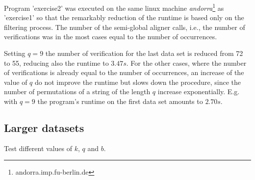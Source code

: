 \documentclass[11pt, notitlepage]{scrartcl}
\begin{document}
Program 'exercise2' was executed on the same linux machine \textit{andorra}\footnote{andorra.imp.fu-berlin.de} as 'exercise1' so that the remarkably reduction of the runtime is based only on the filtering process. The number of the semi-global aligner calls, i.e., the number of verifications was in the most cases equal to the number of occurrences. 

Setting $q=9$ the number of verification for the last data set is reduced from 72 to 55, reducing also the runtime to $3.47s$. For the other cases, where the number of verifications is already equal to the number of occurrences, an increase of the value of $q$ do not improve the runtime but slows down the procedure, since the number of permutations of a string of the length $q$ increase exponentially. E.g. with $q=9$ the program's runtime on the first data set amounts to $2.70s$.



\subsection{Larger datasets}
Test different values of $k$, $q$ and $b$.

\end{document}
